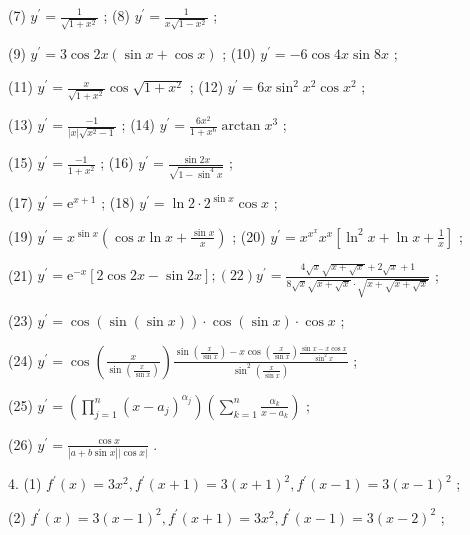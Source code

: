 (7) \({y}^{\prime } = \frac{1}{\sqrt{1 + {x}^{2}}}\) ; (8) \({y}^{\prime } = \frac{1}{x\sqrt{1 - {x}^{2}}}\) ;

(9) \({y}^{\prime } = 3\cos {2x}\left( {\sin x + \cos x}\right)\) ; (10) \({y}^{\prime } =  - 6\cos {4x}\sin {8x}\) ;

(11) \({y}^{\prime } = \frac{x}{\sqrt{1 + {x}^{2}}}\cos \sqrt{1 + {x}^{2}}\) ; (12) \({y}^{\prime } = {6x}{\sin }^{2}{x}^{2}\cos {x}^{2}\) ;

(13) \({y}^{\prime } = \frac{-1}{\left| x\right| \sqrt{{x}^{2} - 1}}\) ; (14) \({y}^{\prime } = \frac{6{x}^{2}}{1 + {x}^{6}}\arctan {x}^{3}\) ;

(15) \({y}^{\prime } = \frac{-1}{1 + {x}^{2}}\) ; (16) \({y}^{\prime } = \frac{\sin {2x}}{\sqrt{1 - {\sin }^{4}x}}\) ;

(17) \({y}^{\prime } = {\mathrm{e}}^{x + 1}\) ; (18) \({y}^{\prime } = \ln 2 \cdot  {2}^{\sin x}\cos x\) ;

(19) \({y}^{\prime } = {x}^{\sin x}\left( {\cos x\ln x + \frac{\sin x}{x}}\right)\) ; (20) \({y}^{\prime } = {x}^{{x}^{x}}{x}^{x}\left\lbrack  {{\ln }^{2}x + \ln x + \frac{1}{x}}\right\rbrack\) ;

(21) \({y}^{\prime } = {\mathrm{e}}^{-x}\left\lbrack  {2\cos {2x} - \sin {2x}}\right\rbrack  ;\left( {22}\right) {y}^{\prime } = \frac{4\sqrt{x}\sqrt{x + \sqrt{x}} + 2\sqrt{x} + 1}{8\sqrt{x}\sqrt{x + \sqrt{x}} \cdot  \sqrt{x + \sqrt{x + \sqrt{x}}}}\) ;

(23) \({y}^{\prime } = \cos \left( {\sin \left( {\sin x}\right) }\right)  \cdot  \cos \left( {\sin x}\right)  \cdot  \cos x\) ;

(24) \({y}^{\prime } = \cos \left( \frac{x}{\sin \left( \frac{x}{\sin x}\right) }\right) \frac{\sin \left( \frac{x}{\sin x}\right)  - x\cos \left( \frac{x}{\sin x}\right) \frac{\sin x - x\cos x}{{\sin }^{2}x}}{{\sin }^{2}\left( \frac{x}{\sin x}\right) }\) ;

(25) \({y}^{\prime } = \left( {\mathop{\prod }\limits_{{j = 1}}^{n}{\left( x - {a}_{j}\right) }^{{\alpha }_{j}}}\right) \left( {\mathop{\sum }\limits_{{k = 1}}^{n}\frac{{\alpha }_{k}}{x - {a}_{k}}}\right)\) ;

(26) \({y}^{\prime } = \frac{\cos x}{\left| {a + b\sin x}\right| \left| {\cos x}\right| }\) .

4. (1) \({f}^{\prime }\left( x\right)  = 3{x}^{2},{f}^{\prime }\left( {x + 1}\right)  = 3{\left( x + 1\right) }^{2},{f}^{\prime }\left( {x - 1}\right)  = 3{\left( x - 1\right) }^{2}\) ;

(2) \({f}^{\prime }\left( x\right)  = 3{\left( x - 1\right) }^{2},{f}^{\prime }\left( {x + 1}\right)  = 3{x}^{2},{f}^{\prime }\left( {x - 1}\right)  = 3{\left( x - 2\right) }^{2}\) ;

